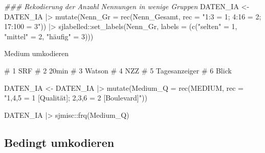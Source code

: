 \documentclass[twoside, pagesize, fontsize=11pt, dvipsnames]{scrreport}
\newenvironment{Shaded}{\begin{snugshade}}{\end{snugshade}}
\newcommand{\AttributeTok}[1]{\textcolor[rgb]{0.40,0.45,0.13}{#1}}
\newcommand{\CommentTok}[1]{\textcolor[rgb]{0.37,0.37,0.37}{#1}}
\newcommand{\DecValTok}[1]{\textcolor[rgb]{0.68,0.00,0.00}{#1}}
\newcommand{\DocumentationTok}[1]{\textcolor[rgb]{0.37,0.37,0.37}{\textit{#1}}}
\newcommand{\FunctionTok}[1]{\textcolor[rgb]{0.28,0.35,0.67}{#1}}
\newcommand{\NormalTok}[1]{\textcolor[rgb]{0.00,0.23,0.31}{#1}}
\newcommand{\OtherTok}[1]{\textcolor[rgb]{0.00,0.23,0.31}{#1}}
\newcommand{\SpecialCharTok}[1]{\textcolor[rgb]{0.37,0.37,0.37}{#1}}
\newcommand{\StringTok}[1]{\textcolor[rgb]{0.13,0.47,0.30}{#1}}
\begin{document}
\begin{Shaded}
\begin{Highlighting}[]
\DocumentationTok{\#\#\# Rekodierung der Anzahl Nennungen in wenige Gruppen}
\NormalTok{DATEN\_IA }\OtherTok{\textless{}{-}}\NormalTok{ DATEN\_IA }\SpecialCharTok{|\textgreater{}} 
  \FunctionTok{mutate}\NormalTok{(}\AttributeTok{Nenn\_Gr =} \FunctionTok{rec}\NormalTok{(Nenn\_Gesamt, }\AttributeTok{rec =} \StringTok{"1:3 = 1; 4:16 = 2; 17:100 = 3"}\NormalTok{)) }\SpecialCharTok{|\textgreater{}} 
\NormalTok{  sjlabelled}\SpecialCharTok{::}\FunctionTok{set\_labels}\NormalTok{(Nenn\_Gr, }\AttributeTok{labels =}\NormalTok{ (}\FunctionTok{c}\NormalTok{(}\StringTok{"selten"} \OtherTok{=} \DecValTok{1}\NormalTok{, }\StringTok{"mittel"} \OtherTok{=} \DecValTok{2}\NormalTok{, }\StringTok{"häufig"} \OtherTok{=} \DecValTok{3}\NormalTok{)))}
\end{Highlighting}
\end{Shaded}

Medium umkodieren

\begin{Shaded}
\begin{Highlighting}[]
\CommentTok{\# 1 SRF}
\CommentTok{\# 2 20min}
\CommentTok{\# 3 Watson}
\CommentTok{\# 4 NZZ}
\CommentTok{\# 5 Tagesanzeiger}
\CommentTok{\# 6 Blick}

\NormalTok{DATEN\_IA }\OtherTok{\textless{}{-}}\NormalTok{ DATEN\_IA }\SpecialCharTok{|\textgreater{}} 
  \FunctionTok{mutate}\NormalTok{(}\AttributeTok{Medium\_Q =} \FunctionTok{rec}\NormalTok{(MEDIUM, }
                    \AttributeTok{rec =} \StringTok{"1,4,5 = 1 [Qualität]; 2,3,6 = 2 [Boulevard]"}\NormalTok{)) }

\NormalTok{DATEN\_IA }\SpecialCharTok{|\textgreater{}}\NormalTok{ sjmisc}\SpecialCharTok{::}\FunctionTok{frq}\NormalTok{(Medium\_Q)}
\end{Highlighting}
\end{Shaded}

\hypertarget{bedingt-umkodieren}{%
\subsection{Bedingt umkodieren}\label{bedingt-umkodieren}}
\end{document}
